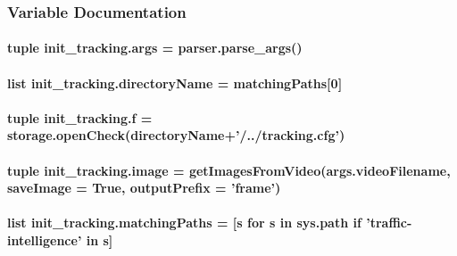 \subsubsection{Variable Documentation}
\hypertarget{namespaceinit__tracking_a4f6d6b812ef6af92cf5547cd3bb9e7c1}{
\paragraph[{args}]{\setlength{\rightskip}{0pt plus 5cm}tuple init\-\_\-tracking.\-args = parser.\-parse\-\_\-args()}}\label{namespaceinit__tracking_a4f6d6b812ef6af92cf5547cd3bb9e7c1}
\hypertarget{namespaceinit__tracking_a8ca67cf7fc266b8664e0e0616ca29397}{
\paragraph[{directory\-Name}]{\setlength{\rightskip}{0pt plus 5cm}list init\-\_\-tracking.\-directory\-Name = {\bf matching\-Paths}\mbox{[}0\mbox{]}}}\label{namespaceinit__tracking_a8ca67cf7fc266b8664e0e0616ca29397}
\hypertarget{namespaceinit__tracking_a34c52058a9dcd8c6482f796437d0c14d}{
\paragraph[{f}]{\setlength{\rightskip}{0pt plus 5cm}tuple init\-\_\-tracking.\-f = {\bf storage.\-open\-Check}({\bf directory\-Name}+'/../tracking.\-cfg')}}\label{namespaceinit__tracking_a34c52058a9dcd8c6482f796437d0c14d}
\hypertarget{namespaceinit__tracking_a57bdd1f19f963cb83e6216cc27142c84}{
\paragraph[{image}]{\setlength{\rightskip}{0pt plus 5cm}tuple init\-\_\-tracking.\-image = get\-Images\-From\-Video(args.\-video\-Filename, save\-Image = True, output\-Prefix = 'frame')}}\label{namespaceinit__tracking_a57bdd1f19f963cb83e6216cc27142c84}
\hypertarget{namespaceinit__tracking_a9e5429abd9b30feafa3ffbd4a44da45d}{
\paragraph[{matching\-Paths}]{\setlength{\rightskip}{0pt plus 5cm}list init\-\_\-tracking.\-matching\-Paths = \mbox{[}s for s in sys.\-path if 'traffic-\/intelligence' in s\mbox{]}}}\label{namespaceinit__tracking_a9e5429abd9b30feafa3ffbd4a44da45d}
